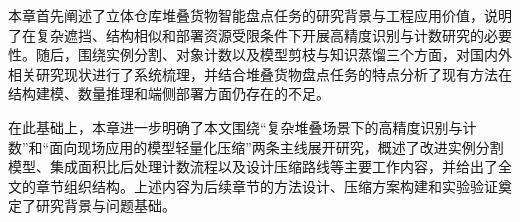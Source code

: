 本章首先阐述了立体仓库堆叠货物智能盘点任务的研究背景与工程应用价值，说明了在复杂遮挡、结构相似和部署资源受限条件下开展高精度识别与计数研究的必要性。随后，围绕实例分割、对象计数以及模型剪枝与知识蒸馏三个方面，对国内外相关研究现状进行了系统梳理，并结合堆叠货物盘点任务的特点分析了现有方法在结构建模、数量推理和端侧部署方面仍存在的不足。

在此基础上，本章进一步明确了本文围绕“复杂堆叠场景下的高精度识别与计数”和“面向现场应用的模型轻量化压缩”两条主线展开研究，概述了改进实例分割模型、集成面积比后处理计数流程以及设计压缩路线等主要工作内容，并给出了全文的章节组织结构。上述内容为后续章节的方法设计、压缩方案构建和实验验证奠定了研究背景与问题基础。
